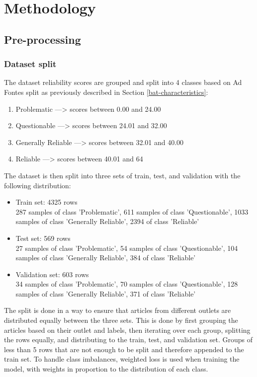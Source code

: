 \chapter{Methodology}
\label{cha:5}

\section{Pre-processing}

\subsection{Dataset split}

The dataset reliability scores are grouped and split into 4 classes based on Ad Fontes split as previously described in Section \ref{bat-characteristics}:
\begin{enumerate}
    \item Problematic ---> scores between 0.00 and 24.00
    \item Questionable ---> scores between 24.01 and 32.00
    \item Generally Reliable ---> scores between 32.01 and 40.00
    \item Reliable ---> scores between 40.01 and 64
\end{enumerate}

The dataset is then split into three sets of train, test, and validation with the following distribution:
\begin{itemize}
    \item Train set: 4325 rows \\
          287 samples of class 'Problematic', 611 samples of class 'Questionable', 1033 samples of class 'Generally Reliable', 2394 of class 'Reliable'
    \item Test set: 569 rows \\
          27 samples of class 'Problematic', 54 samples of class 'Questionable', 104 samples of class 'Generally Reliable', 384 of class 'Reliable'
    \item Validation set: 603 rows \\
          34 samples of class 'Problematic', 70 samples of class 'Questionable', 128 samples of class 'Generally Reliable', 371 of class 'Reliable'
\end{itemize}

The split is done in a way to ensure that articles from different outlets are distributed equally between the three sets. This is done by first grouping the articles based on their outlet and labels, then iterating over each group, splitting the rows equally, and distributing to the train, test, and validation set. Groups of less than 5 rows that are not enough to be split and therefore appended to the train set. To handle class imbalances, weighted loss is used when training the model, with weights in proportion to the distribution of each class.

